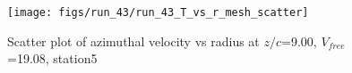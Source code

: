 \begin{figure}[H]
\centering
\texttt{[image: figs/run\_43/run\_43\_T\_vs\_r\_mesh\_scatter]}
\caption{Scatter plot of azimuthal velocity vs radius at $z/c$=9.00, $V_{free}$=19.08, station5}
\label{fig:run_43_T_vs_r_mesh_scatter}
\end{figure}


